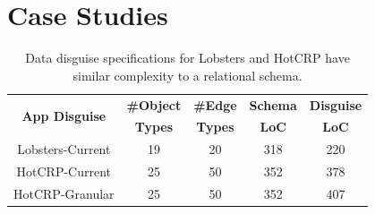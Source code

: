 \section{Case Studies}
\label{sec:hotcrp_example}

\begin{table}[t!]
    \centering
    \footnotesize
    \begin{tabular}{@{}ccccc@{}}
        \multirow{2}{*}{\textbf{App Disguise}} & \textbf{\#Object} & \textbf{\#Edge} & \textbf{Schema} &
        \textbf{Disguise} \\
        & \textbf{Types} & \textbf{Types} & \textbf{LoC} & \textbf{LoC} \\
    \midrule
    Lobsters-Current & 19 & 20 & 318 & 220 \\
    HotCRP-Current & 25 & 50 & 352 & 378 \\
    HotCRP-Granular & 25 & 50 & 352 & 407 \\
\end{tabular}
    \caption{Data disguise specifications for Lobsters and HotCRP have similar complexity to
    a relational schema.
    }
\label{tab:loc}
\end{table}

